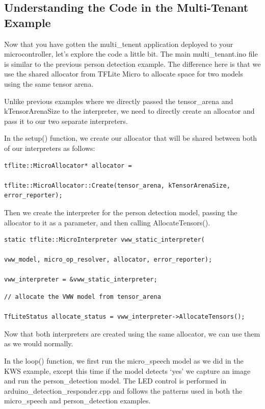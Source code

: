 \subsection{Understanding the Code in the Multi-Tenant Example}

Now that you have gotten the multi\_tenent application deployed to your microcontroller, let's explore the code a little bit. The main multi\_tenant.ino file is similar to the previous person detection example. The difference here is that we use the shared allocator from TFLite Micro to allocate space for two models using the same tensor arena.

Unlike previous examples where we directly passed the tensor\_arena and kTensorArenaSize to the interpreter, we need to directly create an allocator and pass it to our two separate interpreters.

In the setup() function, we create our allocator that will be shared between both of our interpreters as follows:

\begin{lstlisting}
tflite::MicroAllocator* allocator =

tflite::MicroAllocator::Create(tensor_arena, kTensorArenaSize, error_reporter);
\end{lstlisting}


Then we create the interpreter for the person detection model, passing the allocator to it as a parameter, and then calling AllocateTensors().

\begin{lstlisting}
static tflite::MicroInterpreter vww_static_interpreter(

vww_model, micro_op_resolver, allocator, error_reporter);

vww_interpreter = &vww_static_interpreter;
\end{lstlisting}


\begin{lstlisting}
// allocate the VWW model from tensor_arena

TfLiteStatus allocate_status = vww_interpreter->AllocateTensors();
\end{lstlisting}

Now that both interpreters are created using the same allocator, we can use them as we would normally.

In the loop() function, we first run the micro\_speech model as we did in the KWS example, except this time if the model detects ‘yes’ we capture an image and run the person\_detection model. The LED control is performed in arduino\_detection\_responder.cpp and follows the patterns used in both the micro\_speech and person\_detection examples.

